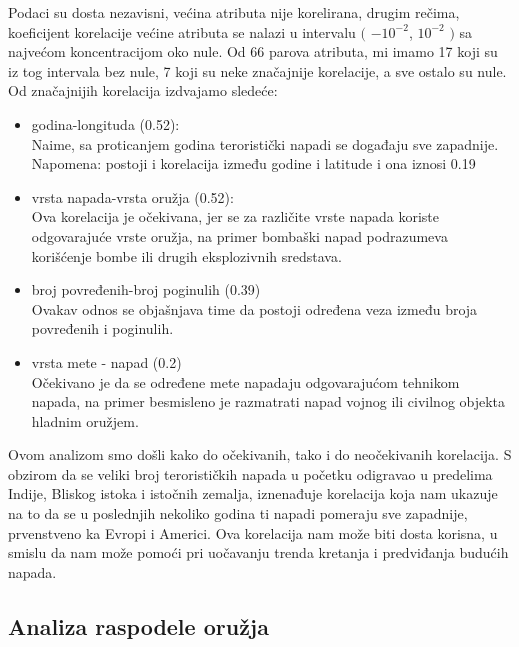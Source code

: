 \documentclass[a4paper]{article}
\begin{document}
Podaci su dosta nezavisni, većina atributa nije korelirana, drugim rečima, koeficijent korelacije većine atributa se nalazi u intervalu $($ $-10^{-2}$, $10^{-2}$ $)$ sa najvećom koncentracijom oko nule. Od 66 parova atributa, mi imamo 17 koji su iz tog intervala bez nule, 7 koji su neke značajnije korelacije, a sve ostalo su nule. Od značajnijih korelacija izdvajamo sledeće: 
\begin{itemize} 
	\item godina-longituda (0.52): \\ Naime, sa proticanjem godina teroristički napadi se događaju sve zapadnije.\\ Napomena: postoji i korelacija između godine i latitude i ona iznosi 0.19 
	\item vrsta napada-vrsta oružja (0.52): \\ Ova korelacija je očekivana, jer se za različite vrste napada koriste odgovarajuće vrste oružja, na primer bombaški napad podrazumeva korišćenje bombe ili drugih eksplozivnih sredstava. 
	\item broj povređenih-broj poginulih (0.39) \\ Ovakav odnos se objašnjava time da postoji određena veza između broja povređenih i poginulih. 
	\item vrsta mete - napad (0.2) \\ Očekivano je da se određene mete napadaju odgovarajućom tehnikom napada, na primer besmisleno je razmatrati napad vojnog ili civilnog objekta hladnim oružjem.\\ 
\end{itemize}

Ovom analizom smo došli kako do očekivanih, tako i do neočekivanih korelacija. S obzirom da se veliki broj terorističkih napada u početku odigravao u predelima Indije, Bliskog istoka i istočnih zemalja, iznenađuje korelacija koja nam ukazuje na to da se u poslednjih nekoliko godina ti napadi pomeraju sve zapadnije, prvenstveno ka Evropi i Americi. Ova korelacija nam može biti dosta korisna, u smislu da nam može pomoći pri uočavanju trenda kretanja i predviđanja budućih napada.

\subsection{Analiza raspodele oružja}
\end{document}
